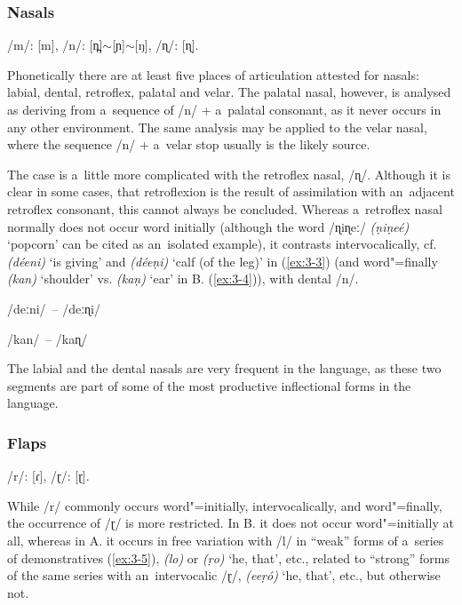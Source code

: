 \subsubsection*{Nasals}

/m/: [m], /n/: [n̪]$\sim${}[ɲ]$\sim$[ŋ], /ɳ/: [ɳ].


Phonetically there are at least five places of articulation attested for nasals: labial, dental, retroflex, palatal and velar. The palatal nasal, however, is analysed as deriving from a~sequence of /n/ + a~palatal consonant, as it never occurs in any other environment. The same analysis may be applied to the velar nasal, where the sequence /n/ + a~velar stop usually is the likely source.


The case is a~little more complicated with the retroflex nasal, /ɳ/. Although it is clear in some cases, that retroflexion is the result of assimilation with an~adjacent retroflex consonant, this cannot always be concluded. Whereas a~retroflex nasal normally does not occur word initially (although the word /ɳiɳeː/ \textit{(ṇiṇeé)} `popcorn' can be cited as an~isolated example), it contrasts intervocalically, cf. \textit{(déeni)} `is giving' and \textit{(déeṇi)} `calf (of the leg)' in (\ref{ex:3-3}) (and word"=finally \textit{(kan)} `shoulder' vs. \textit{(kaṇ)} `ear' in B. (\ref{ex:3-4})), with dental /n/. 

\begin{exe}
\ex
\label{ex:3-3}
/deːni/~-- /deːɳi/

\ex
\label{ex:3-4}
/kan/~-- /kaɳ/
\end{exe}

The labial and the dental nasals are very frequent in the language, as these two segments are part of some of the most productive inflectional forms in the language.

\subsubsection*{Flaps}

/r/: [ɾ], /ɽ/: [ɽ].


While /r/ commonly occurs word"=initially, intervocalically, and word"=finally, the occurrence of /ɽ/
is more restricted. In B. it does not occur word"=initially at all, whereas in A. it occurs in free
variation with /l/ in ``weak'' forms of a~series of demonstratives (\ref{ex:3-5}), \textit{(lo)} or
\textit{(ṛo)} `he, that', etc., related to ``strong'' forms of the same series with an~intervocalic
/ɽ/, \textit{(eeṛó)} `he, that', etc., but otherwise not.

